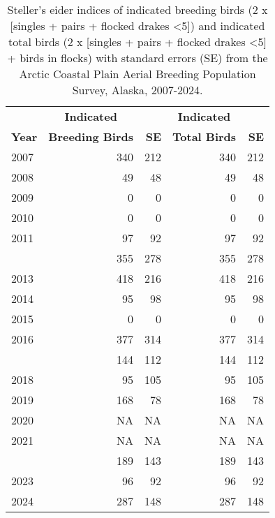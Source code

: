 \documentclass[
]{article}
\begin{document}
\begingroup\fontsize{10}{12}\selectfont

\begin{longtable}[t]{lrrrr}

\caption{\label{tbl-STEI}Steller's eider indices of indicated breeding
birds (2 x {[}singles + pairs + flocked drakes \textless5{]}) and
indicated total birds (2 x {[}singles + pairs + flocked drakes
\textless5{]} + birds in flocks) with standard errors (SE) from the
Arctic Coastal Plain Aerial Breeding Population Survey, Alaska,
2007-2024.}

\tabularnewline

\\
\toprule
\multicolumn{1}{c}{\textbf{ }} & \multicolumn{1}{c}{\textbf{Indicated}} & \multicolumn{1}{c}{\textbf{ }} & \multicolumn{1}{c}{\textbf{Indicated}} & \multicolumn{1}{c}{\textbf{ }} \\
\cmidrule(l{3pt}r{3pt}){2-2} \cmidrule(l{3pt}r{3pt}){4-4}
\textbf{Year} & \textbf{Breeding Birds} & \textbf{SE} & \textbf{Total Birds} & \textbf{SE}\\
\midrule
2007 & 340 & 212 & 340 & 212\\
2008 & 49 & 48 & 49 & 48\\
2009 & 0 & 0 & 0 & 0\\
2010 & 0 & 0 & 0 & 0\\
2011 & 97 & 92 & 97 & 92\\
\addlinespace
2012 & 355 & 278 & 355 & 278\\
2013 & 418 & 216 & 418 & 216\\
2014 & 95 & 98 & 95 & 98\\
2015 & 0 & 0 & 0 & 0\\
2016 & 377 & 314 & 377 & 314\\
\addlinespace
2017 & 144 & 112 & 144 & 112\\
2018 & 95 & 105 & 95 & 105\\
2019 & 168 & 78 & 168 & 78\\
2020 & NA & NA & NA & NA\\
2021 & NA & NA & NA & NA\\
\addlinespace
2022 & 189 & 143 & 189 & 143\\
2023 & 96 & 92 & 96 & 92\\
2024 & 287 & 148 & 287 & 148\\
\bottomrule

\end{longtable}

\endgroup{}

\newpage{}
\end{document}
